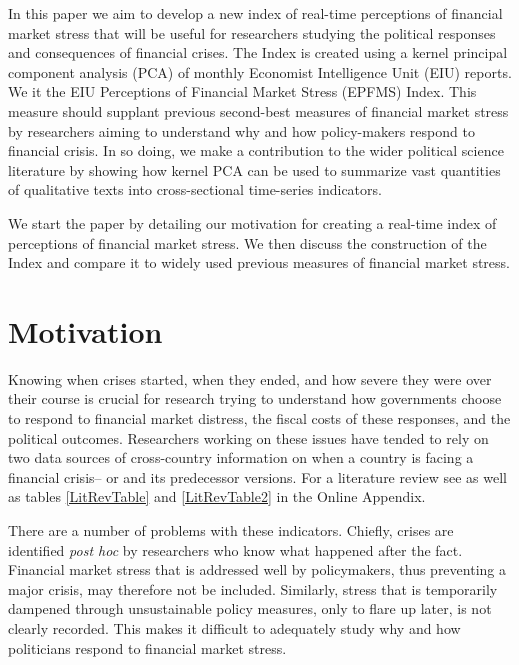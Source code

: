 \documentclass[]{article}
\begin{document}
In this paper we aim to develop a new index
of real-time perceptions of financial market stress that will be useful for researchers studying the political responses and consequences of financial crises. The Index is
created using a kernel principal component analysis (PCA) of monthly
Economist Intelligence Unit (EIU) reports. We it the EIU Perceptions of
Financial Market Stress (EPFMS) Index. This measure should supplant
previous second-best measures of financial market stress by researchers
aiming to understand why and how policy-makers respond to financial
crisis. In so doing, we make a contribution to the wider political
science literature by showing how kernel PCA can be used to summarize
vast quantities of qualitative texts into cross-sectional time-series
indicators.

We start the paper by detailing our motivation for creating a real-time
index of perceptions of financial market stress. We then discuss the
construction of the Index and compare it to widely used previous
measures of financial market stress.


\section{Motivation}\label{motivation}

Knowing when crises started, when they ended, and how severe they were over their course is crucial for research trying to understand how governments choose to respond to financial market distress, the fiscal costs of these responses, and the political outcomes. Researchers working on these issues have tended to rely on two data sources of cross-country information on when a country is facing a financial crisis--\cite{Reinhart2009} or \cite{laeven2013} and its predecessor versions. For a literature review see \cite{GandrudHallerberg2015} as well as tables \ref{LitRevTable} and \ref{LitRevTable2} in the Online Appendix.

There are a number of problems with these indicators. Chiefly, crises are identified \emph{post hoc} by researchers who know what happened after the fact. Financial market stress that is addressed well by policymakers, thus preventing a major crisis, may therefore not be included.
Similarly, stress that is temporarily dampened through unsustainable
policy measures, only to flare up later, is not clearly recorded. This
makes it difficult to adequately study why and how politicians respond
to financial market stress.
\end{document}
